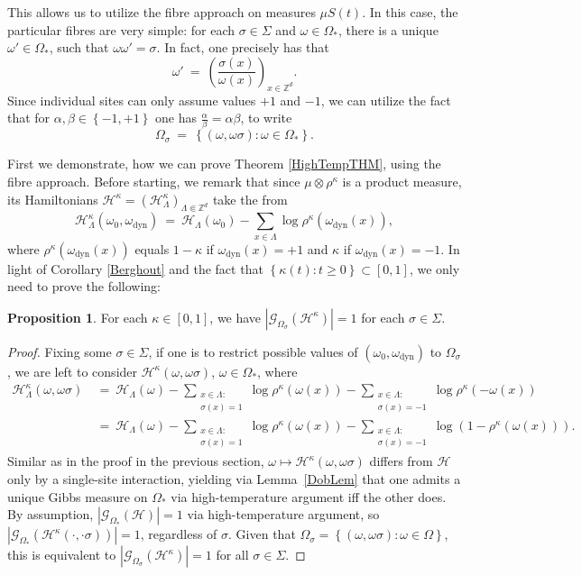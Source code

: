 \documentclass[12pt]{article}
\newcommand{\G}{\mathcal{G}}
\renewcommand{\H}{\mathcal{H}}
\newcommand{\Z}{\mathbb{Z}}
\newcommand{\set}[1]{\left\{#1\right\}}
\newcommand{\oklepaj}[1]{\left(#1\right)}
\newcommand{\pika}{\boldsymbol{\cdot}}
\newcommand{\1}{\mathbbm{1}}
\newcommand{\5}{\vspace{0.5cm}}
\theoremstyle{definition}
\newtheorem{prop}[thm]{Proposition}
\begin{document}
This allows us to utilize the fibre approach on measures $\mu S(t)$. In this case, the particular fibres are very simple: for each $\sigma\in\Sigma$ and $\omega\in\Omega_*$, there is a unique $\omega'\in\Omega_*$, such that $\omega\omega'=\sigma$. In fact, one precisely has that
$$\omega' ~=~ \oklepaj{\frac{\sigma(x)}{\omega(x)}}_{x\in\Z^d}.$$
Since individual sites can only assume values $+1$ and $-1$, we can utilize the fact that for $\alpha,\beta\in\set{-1,+1}$ one has $\frac{\alpha}{\beta}=\alpha\beta$, to write
$$\Omega_\sigma ~=~ \set{(\omega,\omega\sigma):\omega\in\Omega_*}.$$ 

First we demonstrate, how we can prove Theorem \ref{HighTempTHM}, using the fibre approach.  Before starting, we remark that since $\mu\otimes\rho^\kappa$ is a product measure, its Hamiltonians $\H^\kappa=(\H_\Lambda^\kappa)_{\Lambda\Subset\Z^d}$ take the from
$$\H_\Lambda^\kappa(\omega_0,\omega_\mathrm{dyn}) ~=~ \H_\Lambda(\omega_0)-\sum_{x\in\Lambda}\log\rho^\kappa(\omega_\mathrm{dyn}(x)),$$
where $\rho^\kappa(\omega_\mathrm{dyn}(x))$ equals $1-\kappa$ if $\omega_\mathrm{dyn}(x)=+1$ and $\kappa$ if $\omega_\mathrm{dyn}(x)=-1$.
In light of Corollary \ref{Berghout} and the fact that $\set{\kappa(t):t\geq 0}\subset[0,1]$, we only need to prove the following:

\begin{prop}\label{HighTempAlt}
For each $\kappa\in[0,1]$, we have $|\G_{\Omega_\sigma}(\H^\kappa)|=1$ for each $\sigma\in\Sigma$.
\end{prop}

\begin{proof}
Fixing some $\sigma\in\Sigma$, if one is to restrict possible values of $(\omega_0,\omega_\mathrm{dyn})$ to $\Omega_\sigma$, we are left to consider $\H^\kappa(\omega,\omega\sigma)$, $\omega\in\Omega_*$, where
\begin{align*}
\H_\Lambda^\kappa(\omega,\omega\sigma) ~&=~ \H_\Lambda(\omega) - \sum_{\substack{x\in\Lambda:\\\sigma(x)=1}}\log\rho^\kappa(\omega(x)) - \sum_{\substack{x\in\Lambda:\\\sigma(x)=-1}}\log\rho^\kappa(-\omega(x)) \\
&=~ \H_\Lambda(\omega) - \sum_{\substack{x\in\Lambda:\\\sigma(x)=1}}\log\rho^\kappa(\omega(x)) - \sum_{\substack{x\in\Lambda:\\\sigma(x)=-1}}\log\!\oklepaj{1-\rho^\kappa(\omega(x))}.
\end{align*}
Similar as in the proof in the previous section, $\omega\mapsto\H^\kappa(\omega,\omega\sigma)$ differs from $\H$ only by a single-site interaction, yielding via Lemma~\ref{DobLem} that one admits a unique Gibbs measure on $\Omega_*$ via high-temperature argument iff the other does. By assumption, $|\G_{\Omega_*}(\H)|=1$ via high-temperature argument, so $|\G_{\Omega_*}(\H^\kappa(\pika,\pika\sigma))|=1$, regardless of $\sigma$. Given that $\Omega_\sigma=\set{(\omega,\omega\sigma):\omega\in\Omega}$, this is equivalent to $|\G_{\Omega_\sigma}(\H^\kappa)|=1$ for all $\sigma\in\Sigma$.
\end{proof}
\end{document}
